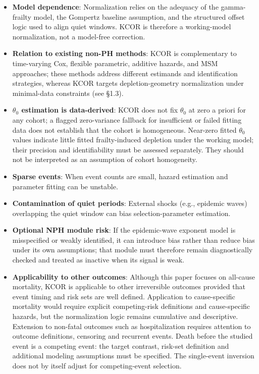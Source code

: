 \documentclass[
]{article}
\providecommand{\tightlist}{%
  \setlength{\itemsep}{0pt}\setlength{\parskip}{0pt}}
\begin{document}
\begin{itemize}
\tightlist
\item
  \textbf{Model dependence}: Normalization relies on the adequacy of the gamma-frailty model, the Gompertz baseline assumption, and the structured offset logic used to align quiet windows. KCOR is therefore a working-model normalization, not a model-free correction.
\item
  \textbf{Relation to existing non-PH methods}: KCOR is complementary to time-varying Cox, flexible parametric, additive hazards, and MSM approaches; these methods address different estimands and identification strategies, whereas KCOR targets depletion-geometry normalization under minimal-data constraints (see §1.3).
\item
  \textbf{\(\theta_0\) estimation is data-derived}: KCOR does not fix \(\theta_0\) at zero a priori for any cohort; a flagged zero-variance fallback for insufficient or failed fitting data does not establish that the cohort is homogeneous. Near-zero fitted \(\theta_0\) values indicate little fitted frailty-induced depletion under the working model; their precision and identifiability must be assessed separately. They should not be interpreted as an assumption of cohort homogeneity.
\item
  \textbf{Sparse events}: When event counts are small, hazard estimation and parameter fitting can be unstable.
\item
  \textbf{Contamination of quiet periods}: External shocks (e.g., epidemic waves) overlapping the quiet window can bias selection-parameter estimation.
\item
  \textbf{Optional NPH module risk}: If the epidemic-wave exponent model is misspecified or weakly identified, it can introduce bias rather than reduce bias under its own assumptions; that module must therefore remain diagnostically checked and treated as inactive when its signal is weak.
\item
  \textbf{Applicability to other outcomes}: Although this paper focuses on all-cause mortality, KCOR is applicable to other irreversible outcomes provided that event timing and risk sets are well defined. Application to cause-specific mortality would require explicit competing-risk definitions and cause-specific hazards, but the normalization logic remains cumulative and descriptive. Extension to non-fatal outcomes such as hospitalization requires attention to outcome definitions, censoring and recurrent events. Death before the studied event is a competing event: the target contrast, risk-set definition and additional modeling assumptions must be specified. The single-event inversion does not by itself adjust for competing-event selection.

\end{itemize}
\end{document}
